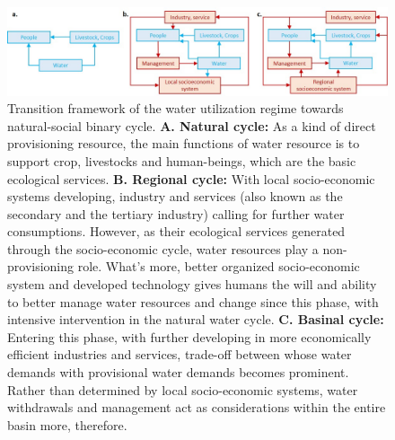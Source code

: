 \documentclass[9pt, twocolumn, twoside, lineno]{pnas-new}
\begin{document}
\begin{figure}[thbp]
	\centering
	\includegraphics[width=\linewidth]{../../figures/main_text/framework}
	\caption{
		Transition framework of the water utilization regime towards natural-social binary cycle.
		\textbf{A. Natural cycle:} As a kind of direct provisioning resource, the main functions of water resource is to support crop, livestocks and human-beings, which are the basic ecological services.
		\textbf{B. Regional cycle:} With local socio-economic systems developing, industry and services (also known as the secondary and the tertiary industry) calling for further water consumptions.
		However, as their ecological services generated through the socio-economic cycle, water resources play a non-provisioning role. What's more, better organized socio-economic system and developed technology gives humans the will and ability to better manage water resources and change since this phase, with intensive intervention in the natural water cycle. 
		\textbf{C. Basinal cycle:} Entering this phase, with further developing in more economically efficient industries and services, trade-off between whose water demands with provisional water demands becomes prominent. Rather than determined by local socio-economic systems, water withdrawals and management act as considerations within the entire basin more, therefore. 
	}
	\label{fig:framework}
\end{figure}
\end{document}
